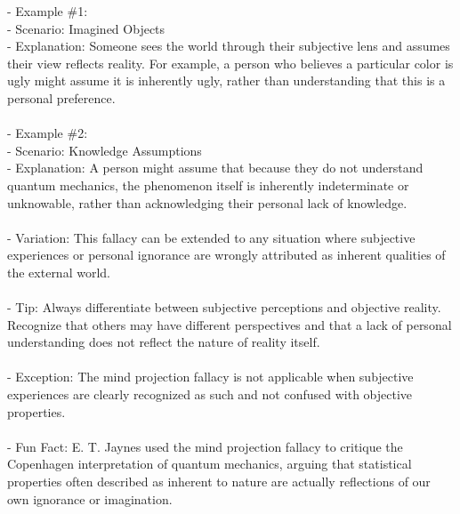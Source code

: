 \documentclass[a4paper,12pt,single,pdftex]{scrartcl}
\begin{document}
{    
      - Example \#1:
    \\

    
        - Scenario: Imagined Objects
    \\

    
        - Explanation: Someone sees the world through their subjective lens and assumes their view reflects reality. For example, a person who believes a particular color is ugly might assume it is inherently ugly, rather than understanding that this is a personal preference.
    \\

    
      
    \\

    
      - Example \#2:
    \\

    
        - Scenario: Knowledge Assumptions
    \\

    
        - Explanation: A person might assume that because they do not understand quantum mechanics, the phenomenon itself is inherently indeterminate or unknowable, rather than acknowledging their personal lack of knowledge.
    \\

    
      
    \\

    
      - Variation: This fallacy can be extended to any situation where subjective experiences or personal ignorance are wrongly attributed as inherent qualities of the external world.
    \\

    
      
    \\

    
      - Tip: Always differentiate between subjective perceptions and objective reality. Recognize that others may have different perspectives and that a lack of personal understanding does not reflect the nature of reality itself.
    \\

    
      
    \\

    
      - Exception: The mind projection fallacy is not applicable when subjective experiences are clearly recognized as such and not confused with objective properties.
    \\

    
      
    \\

    
      - Fun Fact: E. T. Jaynes used the mind projection fallacy to critique the Copenhagen interpretation of quantum mechanics, arguing that statistical properties often described as inherent to nature are actually reflections of our own ignorance or imagination.
    \\

  }
\end{document}
